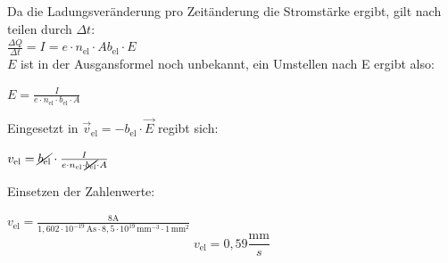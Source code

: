 {    Da die Ladungsveränderung pro Zeitänderung die Stromstärke ergibt, gilt nach teilen durch $\Delta t$:\\

    $ \frac{\Delta Q}{\Delta t} = I = e \cdot n_\mathrm{el} \cdot A  b_\mathrm{el} \cdot E$\\

    $E$ ist in der Ausgansformel noch unbekannt, ein Umstellen nach E ergibt also:

    $E = \frac{I}{e \cdot n_\mathrm{el} \cdot b_\mathrm{el} \cdot A}$

    Eingesetzt in $\vec{v}_\mathrm{el} = - b_\mathrm{el} \cdot \vec{E}$ regibt sich: 




	$v_\mathrm{el} = \cancel{b_\mathrm{el}} \cdot \frac{I}{e \cdot n_\mathrm{el} \cdot \cancel{b_\mathrm{el}} \cdot A}$


Einsetzen der Zahlenwerte:

	$v_\mathrm{el} = \frac{8 \mathrm{A}}{1,602 \cdot 10^{-19} \, \mathrm{As} \cdot 8,5 \cdot 10^{19} \, \mathrm{mm}^{-3} \cdot 1 \, \mathrm{mm}^2 }$\\

\begin{equation*}
	v_\mathrm{el} = 0,59 \frac{\mathrm{mm}}{s} 
\end{equation*}	


}